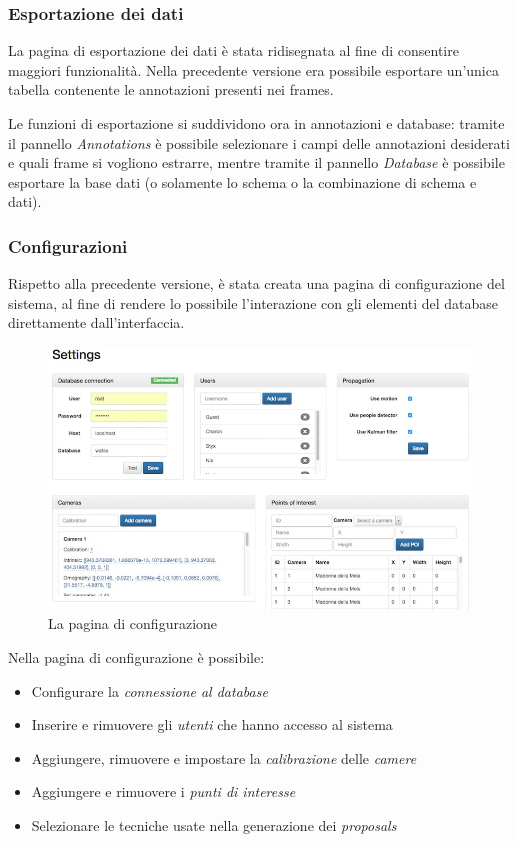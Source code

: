 \subsubsection{Esportazione dei dati}

La pagina di esportazione dei dati è stata ridisegnata al fine di consentire maggiori funzionalità. Nella precedente versione era possibile esportare un'unica tabella contenente le annotazioni presenti nei frames. 

Le funzioni di esportazione si suddividono ora in annotazioni e database: tramite il pannello \emph{Annotations} è possibile selezionare i campi delle annotazioni desiderati e quali frame si vogliono estrarre, mentre tramite il pannello \emph{Database} è possibile esportare la base dati (o solamente lo schema o la combinazione di schema e dati).

\subsubsection{Configurazioni}

Rispetto alla precedente versione, è stata creata una pagina di configurazione del sistema, al fine di rendere lo possibile l'interazione con gli elementi del database direttamente dall'interfaccia.

\begin{figure}[h]
\centering
\includegraphics[width=.8\linewidth]{images/settings.jpg}
  \caption{La pagina di configurazione}
  \label{fig:settings}
\end{figure}

Nella pagina di configurazione è possibile:
\begin{itemize}
\item Configurare la \emph{connessione al database}
\item Inserire e rimuovere gli \emph{utenti} che hanno accesso al sistema
\item Aggiungere, rimuovere e impostare la \emph{calibrazione} delle \emph{camere}
\item Aggiungere e rimuovere i \emph{punti di interesse}
\item Selezionare le tecniche usate nella generazione dei \emph{proposals}
\end{itemize} 

